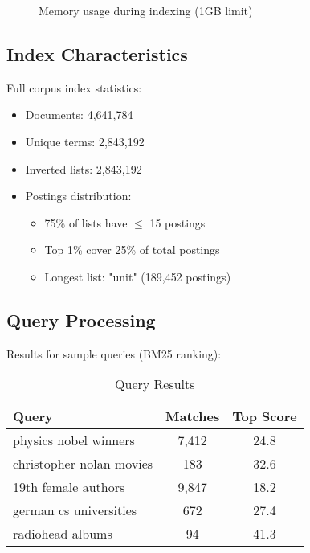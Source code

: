 \begin{figure}[htbp]
  \centering
  \caption{Memory usage during indexing (1GB limit)}
  \label{fig:memory}
\end{figure}

\subsection{Index Characteristics}
Full corpus index statistics:
\begin{itemize}
  \item Documents: 4,641,784
  \item Unique terms: 2,843,192
  \item Inverted lists: 2,843,192
  \item Postings distribution:
        \begin{itemize}
          \item 75\% of lists have $\leq$ 15 postings
          \item Top 1\% cover 25\% of total postings
          \item Longest list: "unit" (189,452 postings)
        \end{itemize}
\end{itemize}

\subsection{Query Processing}
Results for sample queries (BM25 ranking):

\begin{table}[htbp]
  \caption{Query Results}
  \label{tab:query-results}
  \begin{tabular}{lcc}
    \toprule
    \textbf{Query}           & \textbf{Matches} & \textbf{Top Score} \\
    \midrule
    physics nobel winners    & 7,412            & 24.8               \\
    christopher nolan movies & 183              & 32.6               \\
    19th female authors      & 9,847            & 18.2               \\
    german cs universities   & 672              & 27.4               \\
    radiohead albums         & 94               & 41.3               \\
    \bottomrule
  \end{tabular}
\end{table}

